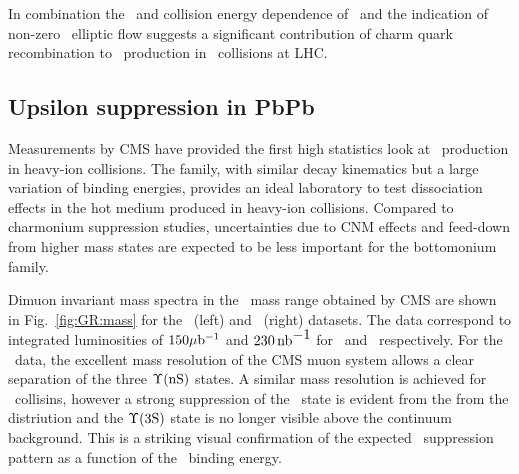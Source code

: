 In combination the \pt\ and collision energy dependence of \jpsi \Raa\ and the indication of non-zero \jpsi\ elliptic
flow suggests a significant contribution of charm quark recombination to \jpsi\ production in \PbPb\ collisions
at LHC.


\subsection{Upsilon suppression in PbPb}

Measurements by CMS have provided the first high statistics look at \PgU\ production in heavy-ion collisions.
The \PgU family, with similar decay kinematics but a large variation of binding energies, 
provides an ideal laboratory to test dissociation effects in the hot medium produced in 
heavy-ion collisions. Compared to charmonium suppression studies, uncertainties due
to CNM effects and feed-down from higher mass states are expected to be 
less important for the bottomonium family.

Dimuon invariant mass spectra in the \PgU\ mass range obtained by CMS are shown in Fig.~\ref{fig:GR:mass} for the \PbPb\ (left) 
and \pp\ (right) datasets. The data correspond to integrated luminosities of $150\mathrm{\mu b^{-1}}$ and $230 \mbox{\ensuremath{\,\mbox{nb}^{\mbox{$-$1}}}}$ for 
\PbPb\ and \pp\, respectively. For the \pp\ data, the excellent mass resolution of the CMS muon system
allows a clear separation of the three $\Upsilon\mbox{(nS)}$ states. A similar mass resolution is achieved for \PbPb\ collisins, 
however a strong suppression of the \PgUb\ state is evident from the from the distriution and the $\Upsilon\mathrm{(3S)}$ state 
is no longer visible above the continuum background. This is a striking visual confirmation of the expected
\PgU\ suppression pattern as a function of the \PgUn\ binding energy.

